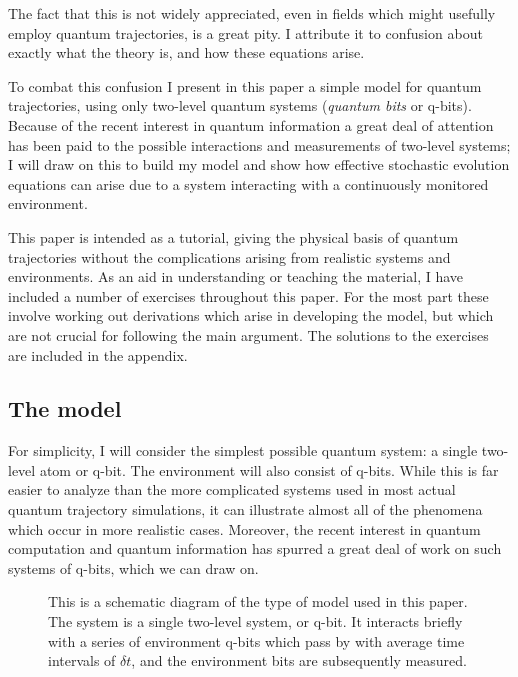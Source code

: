 \documentclass[12pt]{article}
\begin{document}
The fact that this is not widely appreciated, even in fields which might
usefully employ quantum trajectories, is a great pity.  I attribute it
to confusion about exactly what the theory is, and how these equations
arise.

To combat this confusion I present in this paper a simple model for
quantum trajectories, using only two-level quantum systems ({\it quantum bits}
or q-bits).  Because of the recent interest in quantum information
a great deal of attention has been paid to the possible interactions
and measurements of two-level systems; I will draw on this to build my
model and show how effective stochastic evolution equations can arise
due to a system interacting with a continuously monitored environment.

This paper is intended as a tutorial, giving the physical basis of
quantum trajectories without the complications arising from realistic
systems and environments.  As an aid in understanding or teaching the
material, I have included a number of exercises throughout this paper.
For the most part these involve working out derivations which arise in
developing the model, but which are not crucial for following the main
argument.  The solutions to the exercises are included in the appendix.

\subsection{The model}

For simplicity, I will consider the simplest possible quantum system:
a single two-level atom or q-bit.  The environment will also consist of 
q-bits.  While this is far easier to analyze
than the more complicated systems used in most actual quantum trajectory
simulations, it can illustrate almost all of the phenomena which occur
in more realistic cases.  Moreover, the recent interest in
quantum computation and quantum information has spurred a great deal of
work on such systems of q-bits, which we can draw on.

\begin{figure}[ht]

\begin{center}
\label{fig1}
\end{center}
\caption{\small This is a schematic diagram of the type of model used in
this paper.  The system is a single two-level system, or q-bit.  It
interacts briefly with a series of environment q-bits which pass by
with average time intervals of $\delta t$, and the environment bits
are subsequently measured.}
\end{figure}
\end{document}
